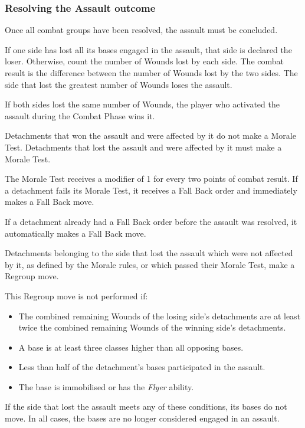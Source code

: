 \subsubsection{Resolving the Assault outcome}

Once all combat groups have been resolved, the assault must be concluded.

If one side has lost all its bases engaged in the assault, that side is declared the loser. Otherwise, count the number of Wounds lost by each side. The combat result is the difference between the number of Wounds lost by the two sides. The side that lost the greatest number of Wounds loses the assault.

If both sides lost the same number of Wounds, the player who activated the assault during the Combat Phase wins it.

Detachments that won the assault and were affected by it do not make a Morale Test. Detachments that lost the assault and were affected by it must make a Morale Test.

The Morale Test receives a modifier of 1 for every two points of combat result. If a detachment fails its Morale Test, it receives a Fall Back order and immediately makes a Fall Back move.

If a detachment already had a Fall Back order before the assault was resolved, it automatically makes a Fall Back move.

Detachments belonging to the side that lost the assault which were not affected by it, as defined by the Morale rules, or which passed their Morale Test, make a Regroup move.

This Regroup move is not performed if:

\begin{itemize}
    \item The combined remaining Wounds of the losing side's detachments are at least twice the combined remaining Wounds of the winning side's detachments.
    \item A base is at least three classes higher than all opposing bases.
    \item Less than half of the detachment's bases participated in the assault.
    \item The base is immobilised or has the \textit{Flyer} ability.
\end{itemize}

If the side that lost the assault meets any of these conditions, its bases do not move. In all cases, the bases are no longer considered engaged in an assault.


